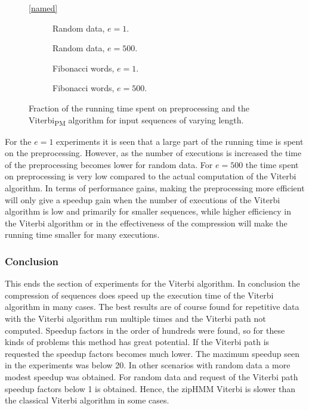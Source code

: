 \begin{figure}
  \centering\ref{named}
  \begin{subfigure}{0.5\textwidth}
    \centering 
    \caption{Random data, $e = 1$.}
  \end{subfigure}%
  \begin{subfigure}{0.5\textwidth}
    \centering 
    \caption{Random data, $ e = 500$.}
  \end{subfigure}

  \begin{subfigure}{0.5\textwidth}
    \centering 
    \caption{Fibonacci words, $e = 1$.}
  \end{subfigure}%
  \begin{subfigure}{0.5\textwidth}
    \centering 
    \caption{Fibonacci words, $ e = 500$.}
  \end{subfigure}
  \caption{Fraction of the running time spent on preprocessing and the
    Viterbi\textsubscript{PM} algorithm for input sequences of varying length.}
  \label{fig:pre_vs_running}
\end{figure}

For the $e = 1$ experiments it is seen that a large part of the running time is
spent on the preprocessing. However, as the number of executions is increased
the time of the preprocessing becomes lower for random data. For $e = 500$ the
time spent on preprocessing is very low compared to the actual computation of
the Viterbi algorithm. In terms of performance gains, making the preprocessing
more efficient will only give a speedup gain when the number of executions of
the Viterbi algorithm is low and primarily for smaller sequences, while higher
efficiency in the Viterbi algorithm or in the effectiveness of the compression
will make the running time smaller for many executions.

\subsubsection{Conclusion}

This ends the section of experiments for the Viterbi algorithm. In
conclusion the compression of sequences does speed up the execution time of the
Viterbi algorithm in many cases. The best results are of course found for
repetitive data with the Viterbi algorithm run multiple times and the Viterbi
path not computed. Speedup factors in the order of hundreds were found, so
for these kinds of problems this method has great potential. If the Viterbi
path is requested the speedup factors becomes much lower. The maximum speedup
seen in the experiments was below 20. In other scenarios with random data a
more modest speedup was obtained. For random data and request of the Viterbi
path speedup factors below 1 is obtained. Hence, the zipHMM Viterbi is slower
than the classical Viterbi algorithm in some cases.

